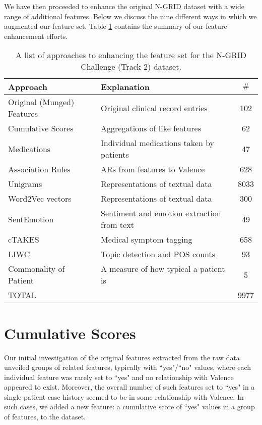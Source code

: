 We have then proceeded to enhance the original N-GRID dataset with a wide range
of additional features. Below we discuss the nine different ways in which we augmented our feature set. Table \ref{tab:features} contains the summary of our feature
enhancement efforts.

\begin{table}[t]
 \centering
 \begin{tabular}{|l|l|c|}
    \hline
    \textsf{Approach}  & \textsf{Explanation} & $\#$  \\
    \hline
      \textsf{Original (Munged) Features}& Original clinical record entries & 102 \\
\hline
      \textsf{Cumulative Scores}& Aggregations of like features & 62 \\ 
      \textsf{Medications} & Individual medications taken by patients & 47 \\ %
           
      \textsf{Association Rules} & ARs from features to \textsf{Valence}& 628\\
     
      \textsf{Unigrams} & Representations of textual data  & 8033 \\ 
      \textsf{Word2Vec vectors}& Representations of textual data & 300 \\
      \textsf{SentEmotion} & Sentiment and emotion extraction from text & 49 \\
      \textsf{cTAKES} & Medical symptom tagging & 658 \\
      \textsf{LIWC} & Topic detection and POS counts & 93 \\ 
      \textsf{Commonality of Patient} & A measure of how typical a patient is & 5 \\
      \hline
      \textsf{TOTAL} & & 9977\\
      \hline
 \end{tabular}
 \caption{A list of approaches to enhancing the feature set for the N-GRID Challenge (Track 2) dataset.}
 \label{tab:features}
\end{table}
 
 
 \section{Cumulative Scores}  Our initial investigation of the original 
 features extracted from the raw data unveiled groups of related features, typically
 with ``yes"/``no" values, where each individual feature was rarely set to ``yes" and no relationship with \textsf{Valence} appeared to exist. Moreover,
 the overall number of such features set to ``yes" in a single patient case history seemed to be in some relationship with \textsf{Valence}.  In such cases, we added a new feature: a
 \textsf{cumulative score} of ``yes" values in a group of features, to the dataset.
 
